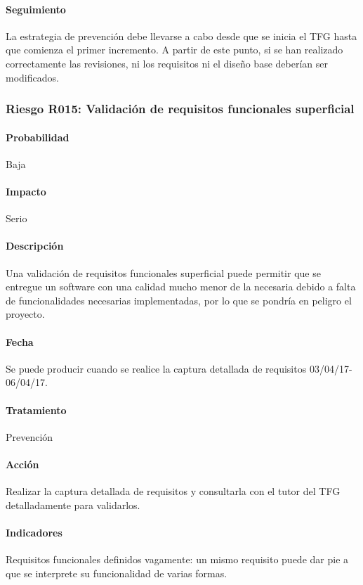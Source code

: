 \documentclass[10pt,a4paper]{article}
\begin{document}
				\paragraph{Seguimiento}	La estrategia de prevención debe llevarse a cabo desde que se inicia el TFG hasta que comienza el primer incremento. A partir de este punto, si se han realizado correctamente las revisiones, ni los requisitos ni el diseño base deberían ser modificados. 

			\subsubsection{Riesgo R015: Validación de requisitos funcionales superficial}
				\paragraph{Probabilidad} Baja
				\paragraph{Impacto}	Serio
				\paragraph{Descripción} Una validación de requisitos funcionales superficial puede permitir que se entregue un software con una calidad mucho menor de la necesaria debido a falta de funcionalidades necesarias implementadas, por lo que se pondría en peligro el proyecto. 
				\paragraph{Fecha} Se puede producir cuando se realice la captura detallada de requisitos 03/04/17-06/04/17. %
				\paragraph{Tratamiento} Prevención %
				\paragraph{Acción} Realizar la captura detallada de requisitos y consultarla con el tutor del TFG detalladamente para validarlos. %
				\paragraph{Indicadores} Requisitos funcionales definidos vagamente: un mismo requisito puede dar pie a que se interprete su funcionalidad de varias formas. %
\end{document}
